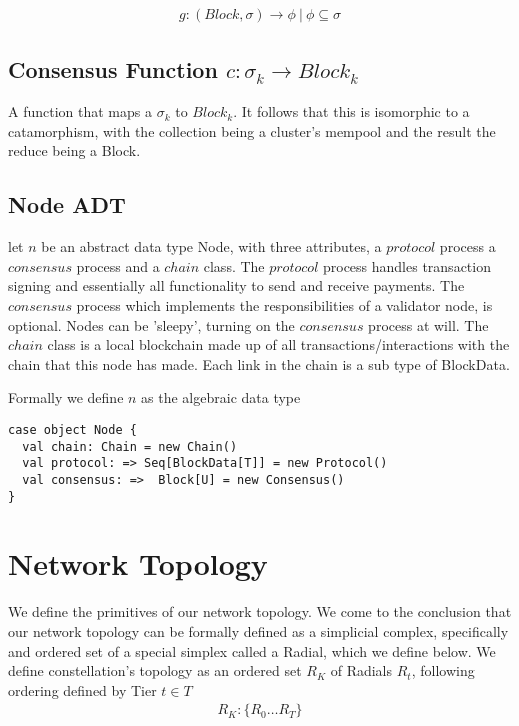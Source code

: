 \documentclass{article}
\begin{document}
\begin{equation} \label{eq1}
\begin{split}
g: (Block, \sigma) \rightarrow \phi \ | \ \phi \subseteq \sigma
\end{split}
\end{equation}


\subsection{Consensus Function $c: \sigma_k \rightarrow  Block_k$}
A function that maps a $\sigma_k$ to $Block_k$. It follows that this is isomorphic to a catamorphism, with the collection being a cluster's mempool and the result the reduce being a Block.

\subsection{Node ADT}
let $n$ be an abstract data type Node, with three attributes, a $protocol$ process a $consensus$ process and a $chain$ class. The $protocol$ process handles transaction signing and essentially all functionality to send and receive payments. The $consensus$ process which implements the responsibilities of a validator node, is optional. Nodes can be 'sleepy', turning on the $consensus$ process at will. The $chain$ class is a local blockchain made up of all transactions/interactions with the chain that this node has made. Each link in the chain is a sub type of BlockData.

Formally we define $n$ as the algebraic data type

\begin{lstlisting}
case object Node {
  val chain: Chain = new Chain()
  val protocol: => Seq[BlockData[T]] = new Protocol()
  val consensus: =>  Block[U] = new Consensus()
}
\end{lstlisting}

\section{Network Topology}
We define the primitives of our network topology. We come to the conclusion that our network topology can be formally defined as a simplicial complex, specifically and ordered set of a special simplex called a Radial, which we define below. We define constellation's topology as an ordered set $R_K$ of Radials $R_t$, following ordering defined by Tier $t \in T$
\begin{equation} \label{eq1}
\begin{split}
R_K: \{R_0 \dots R_T \}
\end{split}
\end{equation}
\end{document}
